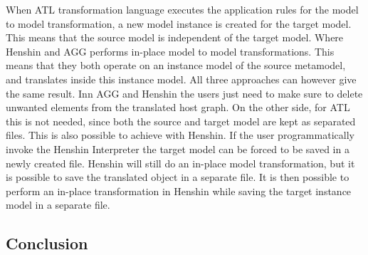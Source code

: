 When ATL transformation language executes the application rules for the model to
model transformation, a new model instance is created for the target model. This
means that the source model is independent of the target model. Where Henshin
and AGG performs in-place model to model transformations. This means that they
both operate on an instance model of the source metamodel, and translates
inside this instance model. All three approaches can however give the same
result. Inn AGG and Henshin the users just need to make sure to delete unwanted
elements from the translated host graph. On the other side, for ATL this is not
needed, since both the source and target model are kept as separated files. This
is also possible to achieve with Henshin. If the user programmatically invoke
the Henshin Interpreter the target model can be forced to be saved in a newly
created file. Henshin will still do an in-place model transformation, but it is
possible to save the translated object in a separate file. It is then possible
to perform an in-place transformation in Henshin while saving the target
instance model in a separate file. 

\subsection{Conclusion}

